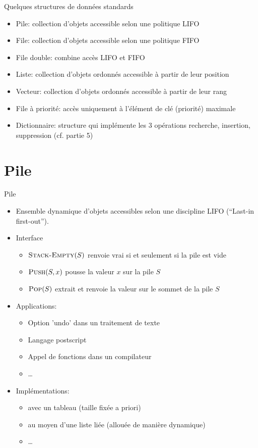 \begin{frame}{Quelques structures de données standards}

\begin{itemize}
\item Pile: collection d'objets accessible selon une politique LIFO
\item File: collection d'objets accessible selon une politique FIFO
\item File double: combine accès LIFO et FIFO
\item Liste: collection d'objets ordonnés accessible à partir de leur position
\item Vecteur: collection d'objets ordonnés accessible à partir de leur rang
\item File à priorité: accès uniquement à l'élément de clé (priorité) maximale

\bigskip

\item Dictionnaire: structure qui implémente les 3 opérations
  recherche, insertion, suppression (cf. partie 5)
\end{itemize}

\end{frame}

\section{Pile}

\begin{frame}{Pile}
\begin{itemize}
\item Ensemble dynamique d'objets accessibles selon une discipline
  \alert{LIFO} (``Last-in first-out'').
\item Interface
\begin{itemize}
\item $\textnormal{\scshape Stack-Empty}(S)$ renvoie vrai si et seulement si la pile est vide
\item $\textnormal{\scshape Push}(S,x)$ pousse la valeur $x$ sur la pile $S$
\item $\textnormal{\scshape Pop}(S)$ extrait et renvoie la valeur sur le sommet de la pile $S$
\end{itemize}
\item Applications:
\begin{itemize}
\item Option 'undo' dans un traitement de texte
\item Langage postscript
\item Appel de fonctions dans un compilateur
\item \ldots
\end{itemize}
\item Implémentations:
\begin{itemize}
\item avec un tableau (taille fixée a priori)
\item au moyen d'une liste liée (allouée de manière dynamique)
\item \ldots
\end{itemize}
\end{itemize}
\end{frame}

